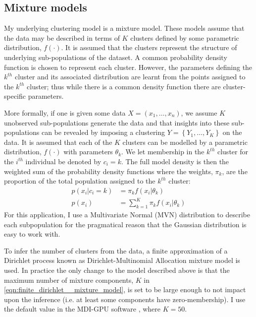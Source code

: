 \documentclass[12pt]{article} %
\begin{document}
	\subsection{Mixture models} \label{sec:theory:sub_sec:mixture_models}
	My underlying clustering model is a mixture model. These models assume that the data may be described in terms of $K$ clusters defined by some parametric distribution, $f(\cdot)$. It is assumed that the clusters represent the structure of underlying sub-populations of the dataset. A common probability density function is chosen to represent each cluster. However, the parameters defining the $k^{th}$ cluster and its associated distribution are learnt from the points assigned to the $k^{th}$ cluster; thus while there is a common density function there are cluster-specific parameters.
	
	More formally, if one is given some data $X = (x_1, \ldots, x_n)$, we assume $K$ unobserved sub-populations generate the data and that insights into these sub-populations can be revealed by imposing a clustering $Y = \left\{Y_1,\ldots,Y_K\right\}$ on the data. It is assumed that each of the $K$ clusters can be modelled by a parametric distribution, $f(\cdot)$ with parameters $\theta_k$. We let membership in the $k^{th}$ cluster for the $i^{th}$ individual be denoted by $c_i = k$. The full model density is then the weighted sum of the probability density functions where the weights, $\pi_k$, are the proportion of the total population assigned to the $k^{th}$ cluster:
	\begin{align}
	p(x_i|c_i = k) &= \pi_k f(x_i | \theta_k) \\
	p(x_i) &= \sum_{k=1}^K \pi_k f(x_i | \theta_k) \label{eqn:finite_dirichlet__mixture_model}
	\end{align}
	For this application, I use a Multivariate Normal (MVN) distribution to describe each subpopulation for the pragmatical reason that the Gaussian distribution is easy to work with. 
	
	To infer the number of clusters from the data, a finite approximation of a Dirichlet process known as Dirichlet-Multinomial Allocation mixture model \citep{green2001modelling} is used. In practice the only change to the model described above is that the maximum  number  of mixture components, $K$ in \eqref{eqn:finite_dirichlet__mixture_model}, is set to be large enough to not impact upon the inference (i.e. at least some components have zero-membership). I use the default value in the MDI-GPU software \citep{MasonMDIGPUacceleratingintegrative2016a}, where $K=50$.
	
\end{document}
